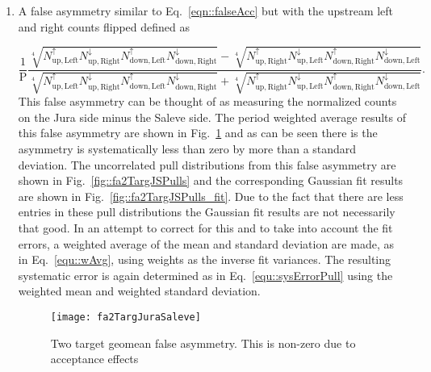 \begin{enumerate}
  \label{tab::additionalFA}

\item A false asymmetry similar to Eq.~\ref{eqn::falseAcc} but with the upstream
  left and right counts flipped defined as
  
  \begin{equation}
    \label{eqn::additionalfalseAsym}
    \frac{1}{\mathrm{P}}
    \frac{
      \sqrt[4]{
        N_{\mathrm{up,Left}}^{\uparrow}N_{\mathrm{up,Right}}^{\downarrow}
        N_{\mathrm{down,Left}}^{\uparrow}N_{\mathrm{down,Right}}^{\downarrow}
      } -
      \sqrt[4]{
        N_{\mathrm{up,Right}}^{\uparrow}N_{\mathrm{up,Left}}^{\downarrow}
        N_{\mathrm{down,Right}}^{\uparrow}N_{\mathrm{down, Left}}^{\downarrow}
      }
    }{
      \sqrt[4]{
        N_{\mathrm{up,Left}}^{\uparrow}N_{\mathrm{up,Right}}^{\downarrow}
        N_{\mathrm{down,Left}}^{\uparrow}N_{\mathrm{down, Right}}^{\downarrow}
      } +
      \sqrt[4]{
        N_{\mathrm{up,Right}}^{\uparrow}N_{\mathrm{up,Left}}^{\downarrow}
        N_{\mathrm{down,Right}}^{\uparrow}N_{\mathrm{down, Left}}^{\downarrow}
      }
    }.
  \end{equation}
  This false asymmetry can be thought of as measuring the normalized counts on
  the Jura side minus the Saleve side.  The period weighted average results of
  this false asymmetry are shown in Fig.~\ref{fig::fa2TargJuraSaleve} and as can
  be seen there is the asymmetry is systematically less than zero by more than a
  standard deviation.  The uncorrelated pull distributions from this false
  asymmetry are shown in Fig.~\ref{fig::fa2TargJSPulls} and the corresponding
  Gaussian fit results are shown in Fig.~\ref{fig::fa2TargJSPulls_fit}.  Due to
  the fact that there are less entries in these pull distributions the Gaussian
  fit results are not necessarily that good.  In an attempt to correct for this
  and to take into account the fit errors, a weighted average of the mean and
  standard deviation are made, as in Eq.~\ref{equ::wAvg}, using weights as the
  inverse fit variances.  The resulting systematic error is again determined as
  in Eq.~\ref{equ::sysErrorPull} using the weighted mean and weighted standard
  deviation.

  \begin{figure}[h!t]
    \centering
    \texttt{[image: fa2TargJuraSaleve]}
    \caption{Two target geomean false asymmetry.  This is non-zero due to
      acceptance effects}
    \label{fig::fa2TargJuraSaleve}
  \end{figure}
  

\end{enumerate}
